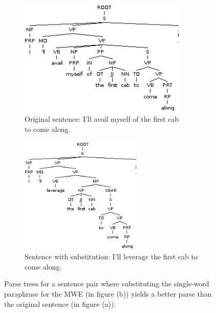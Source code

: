 \documentclass[11pt]{article}
\begin{document}
\begin{figure}
\centering
\begin{subfigure}{.5\textwidth}
  \centering
  \includegraphics[width=80mm]{figs/avail_myself_of_tree.png}
  \caption{Original sentence: I'll avail myself of the first cab \\ to come along.}
  \label{fig:sub1}
\end{subfigure}%
\begin{subfigure}{.5\textwidth}
  \centering
  \includegraphics[width=58mm]{figs/leverage_tree.png}
  \caption{Sentence with substitution: I'll leverage the first cab to come along.}
  \label{fig:sub2}
\end{subfigure}
\caption{Parse trees for a sentence pair where substituting the single-word paraphrase for the MWE (in figure (b)) yields a better parse than the original sentence (in figure (a)).}
\label{avail}
\end{figure}
\end{document}

